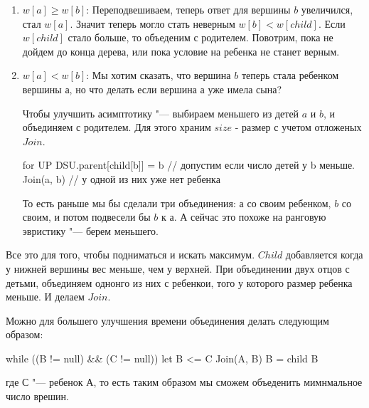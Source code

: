 \begin{enumerate}
\item
	$w[a] \ge w[b]$:
	Переподвешиваем, теперь ответ для вершины $b$ увеличился, стал $w[a]$.
	Значит теперь могло стать неверным $w[b] < w[child]$.
	Если $w[child]$ стало больше, то объеденим с родителем.
	Повотрим, пока не дойдем до конца дерева, или пока условие на ребенка не станет верным.

\item
	$w[a] < w[b]$:
	Мы хотим сказать, что вершина $b$ теперь стала ребенком вершины $а$, но что делать если вершина $а$ уже имела сына?


	Чтобы улучшить асимптотику "--- выбираем меньшего из детей $a$ и $b$, и объединяем с родителем.
	Для этого храним $size$ - размер с учетом отложеных $Join$.
\begin{cppcode}
for UP
	DSU.parent[child[b]] = b // допустим если число детей у b меньше.
		Join(a, b) // у одной из них уже нет ребенка
\end{cppcode}
	То есть раньше мы бы сделали три объединения: $а$ со своим ребенком, $b$ со своим, и потом подвесели бы $b$ к а.
	А сейчас это похоже на ранговую эвристику "--- берем меньшего.
\end{enumerate}

\begin{Rem}
	Все это для того, чтобы подниматься и искать максимум.
	$Child$ добавляется когда у нижней вершины вес меньше, чем у верхней.
	При объединении двух отцов с детьми, объединяем однонго из них с ребенкои, того у которого размер ребенка меньше. И делаем $Join$.


	Можно для большего улучшения времени объединения делать следующим образом:
\begin{cppcode}
while ((B != null) && (C != null))
	let B <= C
	Join(A, B)
	B = child B
\end{cppcode}
	где $С$ "--- ребенок $А$, то есть таким образом мы сможем объеденить мимнмальное число врешин.
\end{Rem}

